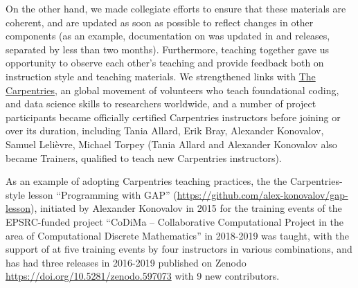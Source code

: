 \documentclass{deliverablereport}
\begin{document}
On the other hand, we made collegiate efforts to ensure that
these materials are coherent, and are updated as soon as possible
to reflect changes in other \ODK components (as an example,
documentation on  was updated in \GAP and 
\SageMath releases, separated by less than two months). Furthermore,
teaching together gave us opportunity to observe each other's
teaching and provide feedback both on instruction style and teaching
materials. We strengthened links with
\href{https://carpentries.org/}{The Carpentries}, an global movement
of volunteers who teach foundational coding, and data science skills 
to researchers worldwide, and a number of project participants became
officially certified Carpentries instructors before joining \ODK or
over its duration, including Tania Allard, Erik Bray, Alexander Konovalov,
Samuel Leli\`evre, Michael Torpey (Tania Allard and Alexander Konovalov
also became Trainers, qualified to teach new Carpentries instructors).

As an example of adopting Carpentries teaching practices, the 
the Carpentries-style lesson ``Programming with GAP''
(\url{https://github.com/alex-konovalov/gap-lesson}), 
initiated by Alexander Konovalov in 2015 for the training events 
of the EPSRC-funded project ``CoDiMa -- Collaborative 
Computational Project in the area of Computational Discrete 
Mathematics'' in 2018-2019 was taught, with the support of 
\ODK at five training events by four instructors in various
combinations,
and has had three releases in 2016-2019 published on Zenodo
\url{https://doi.org/10.5281/zenodo.597073}
with 9 new contributors. %

\printbibliography
\end{document}
